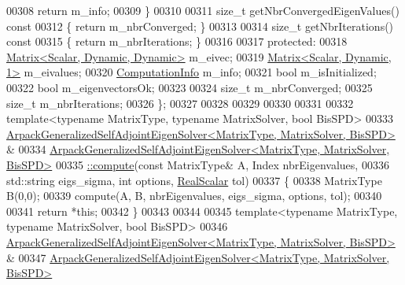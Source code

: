 \begin{DoxyCode}
00308     \textcolor{keywordflow}{return} m\_info;
00309   \}
00310 
00311   \textcolor{keywordtype}{size\_t} getNbrConvergedEigenValues()\textcolor{keyword}{ const}
00312 \textcolor{keyword}{  }\{ \textcolor{keywordflow}{return} m\_nbrConverged; \}
00313 
00314   \textcolor{keywordtype}{size\_t} getNbrIterations()\textcolor{keyword}{ const}
00315 \textcolor{keyword}{  }\{ \textcolor{keywordflow}{return} m\_nbrIterations; \}
00316 
00317 \textcolor{keyword}{protected}:
00318   \hyperlink{group___core___module}{Matrix<Scalar, Dynamic, Dynamic>} m\_eivec;
00319   \hyperlink{group___core___module}{Matrix<Scalar, Dynamic, 1>} m\_eivalues;
00320   \hyperlink{group__enums_ga85fad7b87587764e5cf6b513a9e0ee5e}{ComputationInfo} m\_info;
00321   \textcolor{keywordtype}{bool} m\_isInitialized;
00322   \textcolor{keywordtype}{bool} m\_eigenvectorsOk;
00323 
00324   \textcolor{keywordtype}{size\_t} m\_nbrConverged;
00325   \textcolor{keywordtype}{size\_t} m\_nbrIterations;
00326 \};
00327 
00328 
00329 
00330 
00331 
00332 \textcolor{keyword}{template}<\textcolor{keyword}{typename} MatrixType, \textcolor{keyword}{typename} MatrixSolver, \textcolor{keywordtype}{bool} BisSPD>
00333 \hyperlink{class_eigen_1_1_arpack_generalized_self_adjoint_eigen_solver}{ArpackGeneralizedSelfAdjointEigenSolver<MatrixType, MatrixSolver, BisSPD>}
      &
00334     \hyperlink{class_eigen_1_1_arpack_generalized_self_adjoint_eigen_solver_a1a905e5e65e82e559a2cc394a9f42385}{ArpackGeneralizedSelfAdjointEigenSolver<MatrixType, MatrixSolver, BisSPD>}
00335 \hyperlink{class_eigen_1_1_arpack_generalized_self_adjoint_eigen_solver_a1a905e5e65e82e559a2cc394a9f42385}{::compute}(\textcolor{keyword}{const} MatrixType& A, Index nbrEigenvalues,
00336           std::string eigs\_sigma, \textcolor{keywordtype}{int} options, \hyperlink{class_eigen_1_1_arpack_generalized_self_adjoint_eigen_solver_a2555af55e53bf9de894a49e639be2e1e}{RealScalar} tol)
00337 \{
00338     MatrixType B(0,0);
00339     compute(A, B, nbrEigenvalues, eigs\_sigma, options, tol);
00340     
00341     \textcolor{keywordflow}{return} *\textcolor{keyword}{this};
00342 \}
00343 
00344 
00345 \textcolor{keyword}{template}<\textcolor{keyword}{typename} MatrixType, \textcolor{keyword}{typename} MatrixSolver, \textcolor{keywordtype}{bool} BisSPD>
00346 \hyperlink{class_eigen_1_1_arpack_generalized_self_adjoint_eigen_solver}{ArpackGeneralizedSelfAdjointEigenSolver<MatrixType, MatrixSolver, BisSPD>}
      &
00347     \hyperlink{class_eigen_1_1_arpack_generalized_self_adjoint_eigen_solver_a1a905e5e65e82e559a2cc394a9f42385}{ArpackGeneralizedSelfAdjointEigenSolver<MatrixType, MatrixSolver, BisSPD>}

\end{DoxyCode}
